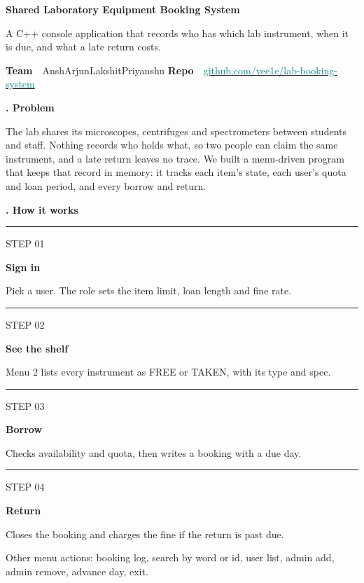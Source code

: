 \documentclass[10pt,a4paper]{article}
\newlength{\secpreskip}
\newcommand{\sechead}[1]{%
  \par\vspace{\secpreskip}%
  \noindent\begin{minipage}{\linewidth}%
    \setlength{\parskip}{0pt}%
    {\cond\bfseries\color{teal}\fontsize{13}{15}\selectfont #1\par}%
    \vspace{0.9mm}{\color{line}\hrule height 0.4pt}%
  \end{minipage}\par\vspace{1.0mm}%
}
\newcommand{\step}[3]{%
  \begin{minipage}[t]{0.232\linewidth}
    \setlength{\parskip}{0pt}%
    {\color{teal}\rule{\linewidth}{1.1pt}}\par\vspace{1.2mm}
    {\mono\fontsize{6.3}{7.5}\selectfont\color{amber}STEP #1}\par\vspace{0.4mm}
    {\bfseries\fontsize{9.4}{11}\selectfont #2}\par\vspace{0.3mm}
    {\fontsize{7.5}{9.4}\selectfont\color{soft} #3}
  \end{minipage}%
}
\begin{document}

{\cond\bfseries\fontsize{25}{26}\selectfont
Shared Laboratory Equipment Booking System\par}
\vspace{1.2mm}
{\fontsize{10.4}{13}\selectfont\color{soft}
A C++ console application that records who has which lab instrument, when it is due, and what a late return costs.\par}
\vspace{3mm}
{\mono\fontsize{7.4}{9}\selectfont
\textbf{Team}\ \ Ansh\quad Arjun\quad Lakshit\quad Priyanshu\hspace{8mm}%
\textbf{Repo}\ \ \href{https://github.com/vee1e/lab-booking-system}{\textcolor{teal}{github.com/vee1e/lab-booking-system}}\par}

\sechead{1. Problem}
The lab shares its microscopes, centrifuges and spectrometers between students and staff. Nothing records who holds what, so two people can claim the same instrument, and a late return leaves no trace. We built a menu-driven program that keeps that record in memory: it tracks each item's state, each user's quota and loan period, and every borrow and return.

\sechead{2. How it works}
\noindent
\step{01}{Sign in}{Pick a user. The role sets the item limit, loan length and fine rate.}\hfill
\step{02}{See the shelf}{Menu 2 lists every instrument as FREE or TAKEN, with its type and spec.}\hfill
\step{03}{Borrow}{Checks availability and quota, then writes a booking with a due day.}\hfill
\step{04}{Return}{Closes the booking and charges the fine if the return is past due.}

\vspace{1.2mm}
{\fontsize{7.3}{9}\selectfont\color{soft}Other menu actions: booking log, search by word or id, user list, admin add, admin remove, advance day, exit.\par}
\end{document}
